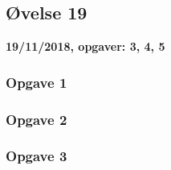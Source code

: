 \horizline

\subsection{Øvelse 19}

\textbf{19/11/2018, opgaver: 3, 4, 5}

\subsubsection{Opgave 1}

\subsubsection{Opgave 2}

\subsubsection{Opgave 3}
